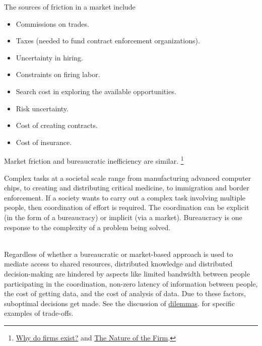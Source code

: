The sources of friction in a market include
\begin{itemize}
    \item Commissions on trades.
    \item Taxes (needed to fund contract enforcement organizations).
    \item Uncertainty in hiring.
    \item Constraints on firing labor.
    \item Search cost in exploring the available opportunities.
    \item Risk uncertainty.
    \item Cost of creating contracts.
    \item Cost of insurance.
\end{itemize}
Market friction and bureaucratic inefficiency are similar. \footnote{  \href{http://www.economist.com/node/17730360}{Why do firms exist?} and \href{https://en.wikipedia.org/wiki/The_Nature_of_the_Firm}{The Nature of the Firm}.
}

Complex tasks at a societal scale range from manufacturing advanced computer chips, to creating and distributing critical medicine, to immigration and border enforcement. 
If a society wants to carry out a complex task involving multiple people, then coordination of effort is required. The coordination can be explicit (in the form of a bureaucracy) or implicit (via a market).  Bureaucracy is one response to the complexity of a problem being solved.


\ \\

Regardless of whether a bureaucratic or market-based approach is used to mediate access to \glspl{shared resource}, 
distributed knowledge and distributed decision-making are hindered by aspects like
limited bandwidth between people participating in the coordination,
non-zero latency of information between people,
the cost of getting data,
and
the cost of analysis of data.
Due to these factors, suboptimal decisions get made. See  %
the discussion of 
\hyperref[sec:dilemma-trilemma]{dilemmas}.
for specific examples of trade-offs.

